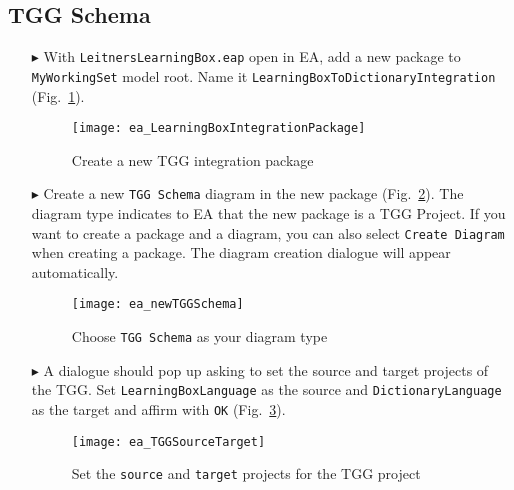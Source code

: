 \newpage
\hypertarget{schema vis}{}
\subsection{TGG Schema}
\genHeader

\begin{itemize}

\item[$\blacktriangleright$] With \texttt{LeitnersLearningBox.eap} open in EA, add a new package to \texttt{MyWorkingSet} model root. Name it
\texttt{Learning\-Box\-To\-Dictionary\-Integration} (Fig.~\ref{ea:intgPackage}).

\vspace{0.5cm}

\begin{figure}[htbp]
\begin{center}
  \texttt{[image: ea\_LearningBoxIntegrationPackage]}
  \caption{Create a new TGG integration package}  
  \label{ea:intgPackage}
\end{center}
\end{figure}

\item[$\blacktriangleright$] Create a new  \texttt{TGG Schema} diagram in the new package (Fig.~\ref{ea:tgg_diagram_type}). The diagram type indicates to EA
that the new package is a TGG Project. If you want to create a package and a diagram, you can also select \texttt{Create Diagram} when creating a package. The diagram creation dialogue will appear automatically.

\vspace{0.5cm}

\begin{figure}[htbp]
\begin{center}
  \texttt{[image: ea\_newTGGSchema]}
  \caption{Choose \texttt{TGG Schema} as your diagram type}  
  \label{ea:tgg_diagram_type}
\end{center}
\end{figure}

\item[$\blacktriangleright$] A dialogue should pop up asking to set the source and target projects of the TGG. Set \texttt{Learning\-Box\-Language} as the
source and \texttt{Dictionary\-Language} as the target and affirm with \texttt{OK} (Fig.~\ref{ea:select_source_target}).

\vspace{0.5cm}

\begin{figure}[htbp]
\begin{center}
  \texttt{[image: ea\_TGGSourceTarget]}
  \caption{Set the \texttt{source} and \texttt{target} projects for the TGG project}  
  \label{ea:select_source_target}
\end{center}
\end{figure}


\end{itemize}
